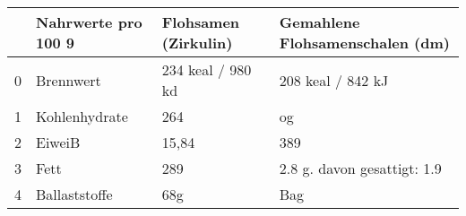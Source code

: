 \begin{tabular}{llll}
\toprule
{} & Nahrwerte pro 100 9 & Flohsamen (Zirkulin) & Gemahlene Flohsamenschalen (dm) \\
\midrule
0 &           Brennwert &    234 keal / 980 kd &               208 keal / 842 kJ \\
1 &       Kohlenhydrate &                  264 &                              og \\
2 &              EiweiB &                15,84 &                             389 \\
3 &                Fett &                  289 &     2.8 g. davon gesattigt: 1.9 \\
4 &       Ballaststoffe &                  68g &                             Bag \\
\bottomrule
\end{tabular}
